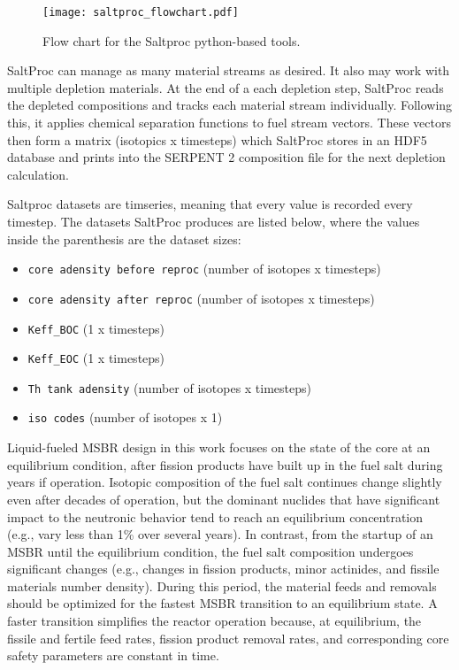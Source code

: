\begin{figure}[htp!] %
  \centering
  \texttt{[image: saltproc\_flowchart.pdf]}
  \caption{Flow chart for the Saltproc python-based tools.}
  \label{fig:saltproc_flow}
\end{figure}

SaltProc can manage as many material streams as desired. It also may work with multiple depletion 
materials. At the end of a each depletion
step, SaltProc reads the depleted compositions and tracks each material stream individually. 
Following this, it applies chemical
separation functions to fuel stream vectors. These vectors then form a matrix (isotopics x 
timesteps) which SaltProc stores in an HDF5 database
and prints into the SERPENT 2 composition file for the next depletion calculation.

Saltproc datasets are timseries, meaning that every value is recorded every timestep. The 
datasets SaltProc produces are listed below,
where the values inside the parenthesis are the dataset sizes:

\begin{itemize}
    \item \texttt{core adensity before reproc} (number of isotopes x timesteps)
    \item \texttt{core adensity after reproc} (number of isotopes x timesteps)
    \item \texttt{Keff\_BOC} (1 x timesteps)
    \item \texttt{Keff\_EOC} (1 x timesteps)
    \item \texttt{Th tank adensity} (number of isotopes x timesteps)
    \item \texttt{iso codes} (number of isotopes x 1)
\end{itemize}

Liquid-fueled \gls{MSBR} design in this work focuses on the state of the core at an equilibrium condition, after fission products have built up in the fuel salt during years if operation. Isotopic composition of the fuel salt continues change slightly even after decades of operation, but the dominant nuclides that have significant impact to the neutronic behavior tend to reach an equilibrium concentration (e.g., vary less than 1\% over several years). In contrast, from the startup of an \gls{MSBR} until the equilibrium condition, the fuel salt composition undergoes significant changes (e.g., changes in fission products, minor actinides, and fissile materials number density). During this period, the material feeds and removals should be optimized for the fastest \gls{MSBR} transition to an equilibrium state. A faster transition simplifies the reactor operation because, at equilibrium, the fissile and fertile feed rates, fission product removal rates, and corresponding core safety parameters are constant in time.

